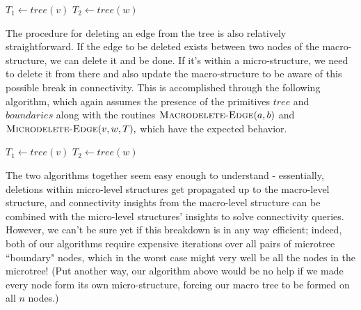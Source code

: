 \documentclass{article}
\begin{document}
\begin{algorithmic}
                 \Return{\True}\EndIf
                \EndFor
    		\EndFor
    		\State \Return{\False}
    \EndProcedure
    
    
            \State $T_1 \gets tree(v)$
            \State $T_2 \gets tree(w)$
            \State {}
    \EndProcedure
\end{algorithmic}

The procedure for deleting an edge from the tree is also relatively straightforward. If the edge to be deleted exists between two nodes of the macro-structure, we can delete it and be done. If it's within a micro-structure, we need to delete it from there and also update the macro-structure to be aware of this possible break in connectivity. This is accomplished through the following algorithm, which again assumes the presence of the primitives $tree$ and $boundaries$ along with the routines $\textsc{Macrodelete-Edge}(a,b)$ and $\textsc{Microdelete-Edge}(v,w,T),$ which have the expected behavior.

\begin{algorithmic}
            \State $T_1\gets tree(v)$
            \State $T_2\gets tree(w)$
                        \State {}
                    \EndIf
                \EndFor
                \State {}
            \Else
                \State {}
            \EndIf
    \EndProcedure
\end{algorithmic}

The two algorithms together seem easy enough to understand - essentially, deletions within micro-level structures get propagated up to the macro-level structure, and connectivity insights from the macro-level structure can be combined with the micro-level structures' insights to solve connectivity queries. However, we can't be sure yet if this breakdown is in any way efficient; indeed, both of our algorithms require expensive iterations over all pairs of microtree ``boundary" nodes, which in the worst case might very well be all the nodes in the microtree! (Put another way, our algorithm above would be no help if we made every node form its own micro-structure, forcing our macro tree to be formed on all $n$ nodes.)
\end{document}
